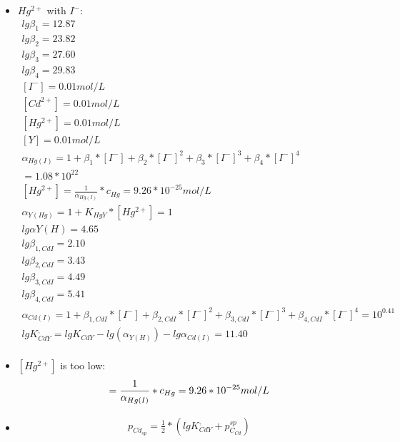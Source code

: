\documentclass{article}
\begin{document}
\begin{itemize}
    \item 
$Hg^{2+}$ with $I^-$:\\
\begin{equation}
    \begin{multlined}
        lg\beta_1 = 12.87\\
        lg\beta_2 = 23.82\\
        lg\beta_3 = 27.60\\
        lg\beta_4 = 29.83\\
        [I^-] = 0.01 mol/L\\
        [Cd^{2+}] = 0.01 mol/L\\
        [Hg^{2+}] = 0.01 mol/L\\
        [Y] = 0.01 mol/L\\
        \alpha_{Hg(I)} = 1 + \beta_1*[I^-] + \beta_2*[I^-]^2 + \beta_3*[I^-]^3 + \beta_4*[I^-]^4\\
        = 1.08*10^{22}\\
        [Hg^{2+}] = \frac{1}{\alpha_{Hg(I)}} * c_{Hg} = 9.26*10^{-25} mol/L\\
        \alpha_{Y(Hg)} = 1 + K_{HgY}*[Hg^{2+}] = 1\\
        lg \alpha{Y(H)} = 4.65\\
        lg\beta_{1,CdI} = 2.10\\
        lg\beta_{2,CdI} = 3.43\\
        lg\beta_{3,CdI} = 4.49\\
        lg\beta_{4,CdI} = 5.41\\
        \alpha_{Cd(I)} = 1 + \beta_{1,CdI}*[I^-] + \beta_{2,CdI}*[I^-]^2 + \beta_{3,CdI} * [I^-]^3 + \beta_{4,CdI}*[I^-]^4 = 10^{0.41}\\
        lgK^{,}_{CdY} = lgK_{CdY} - lg(\alpha_{Y(H)}) - lg \alpha_{Cd(I)}= 11.40\\ 
    \end{multlined}
\end{equation}
    \item
    $[Hg^{2+}]$ is too low:\\
    \begin{equation}
        [Hg^{2+}] = \frac{1}{\alpha_{Hg(I)}} * c_{Hg} = 9.26*10^{-25} mol/L\\
    \end{equation}
    \item
    \begin{equation}
        \begin{multlined}
            p_{Cd}_{sp} = \frac{1}{2}*(lg K^{,}_{CdY} + p_{C_{Cd}}^{sp})\\

\end{multlined}
\end{equation}
\end{itemize}
\end{document}
